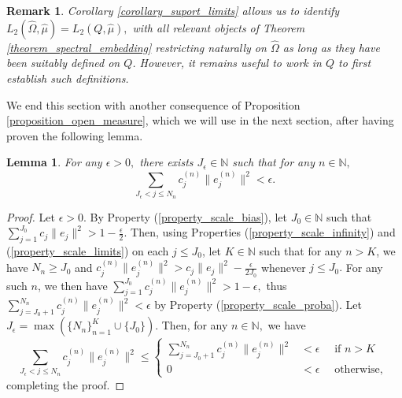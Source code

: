 \documentclass[10pt,a4paper]{amsart}
\newtheorem{lemma}[thm]{Lemma}
\newtheorem{remark}[thm]{Remark}
\def \HOM{\hat{\Omega}}
\def \HMU{\hat{\mu}}
\begin{document}
\begin{remark}
	Corollary \ref{corollary_suport_limits} allows us to identify $L_2(\HOM,\HMU)=L_2(Q,\HMU),$ with all relevant objects of Theorem \ref{theorem_spectral_embedding} restricting naturally on $\HOM$ as long as they have been suitably defined on $Q$. However, it remains useful to work in $Q$ to first establish such definitions.
\end{remark}

We end this section with another consequence of Proposition \ref{proposition_open_measure}, which we will use in the next section, after having proven the following lemma. 

\begin{lemma}\label{lemma_uniform_series}
	For any $\epsilon>0,$ there exists $J_{\epsilon}\in\mathbb{N}$ such that for any $n\in\mathbb{N},$ $$\sum_{J_{\epsilon}<j\leq N_n}c_j^{(n)}\|e_j^{(n)}\|^2<\epsilon.$$
\end{lemma}
\begin{proof}
	Let $\epsilon>0.$ By Property (\ref{property_scale_bias}), let $J_0\in\mathbb{N}$ such that $\sum_{j=1}^{J_0}c_j\|e_j\|^2>1-\frac{\epsilon}{2}.$ Then, using Properties (\ref{property_scale_infinity}) and  (\ref{property_scale_limits}) on each $j\leq J_0$, let $K\in\mathbb{N}$ such that for any $n>K$, we have $N_n\geq J_0$ and  $c_j^{(n)}\|e_j^{(n)}\|^2>c_j\|e_j\|^2-\frac{\epsilon}{2J_0}$ whenever $j\leq J_0.$ For any such $n$, we then have $\sum_{j=1}^{J_0} c_j^{(n)}\|e_j^{(n)}\|^2>1-\epsilon,$ thus $\sum_{j=J_0+1}^{N_n}c_j^{(n)}\|e_j^{(n)}\|^2<\epsilon$ by Property (\ref{property_scale_proba}). Let $J_{\epsilon}=\max(\{N_n\}_{n=1}^K\cup \{J_0\}).$ Then, for any $n\in\mathbb{N},$ we have $$\sum_{J_{\epsilon}<j\leq N_n}c_j^{(n)}\|e_j^{(n)}\|^2\leq\begin{cases}
		\sum_{j=J_0+1}^{N_n}c_j^{(n)}\|e_j^{(n)}\|^2&<\epsilon\quad \text{ if $n>K$ }	\\
		0&<\epsilon\quad \text{ otherwise, }
		\end{cases}$$ completing the proof.
\end{proof}
\end{document}
